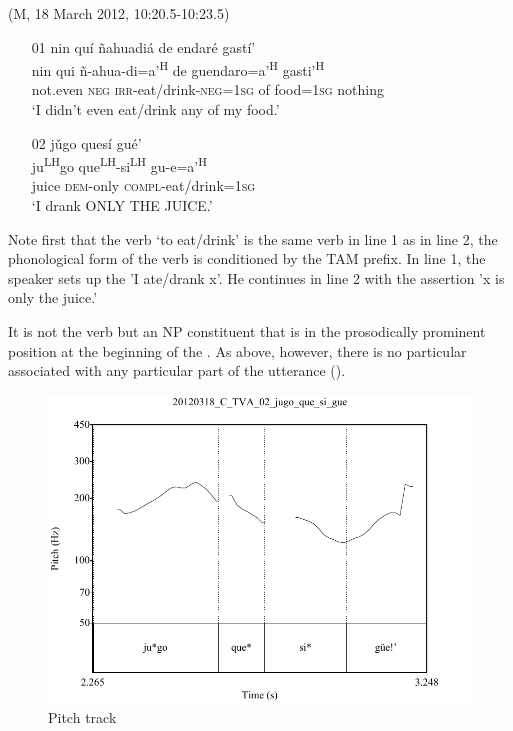 \ea\label{jugoquesigue}(M, 18 March 2012, 10:20.5-10:23.5)
\begin{itemize}
\item [01]
\glll nin qu\'{i} \~{n}ahuadi\'{a} de endar\'{e} gast\'{i}' \\
nin qui \~{n}-ahua-di=a'\textsuperscript{H} de guendaro=a'\textsuperscript{H} gasti'\textsuperscript{H}  \\
not.even \textsc{neg} \textsc{irr}-eat/drink-\textsc{neg}=\textsc{1sg} of food=\textsc{1sg} nothing \\
\glt `I didn't even eat/drink any of my food.'


\item [02]
\glll j\v{u}go ques\'{i} gu\'{e}' \\
ju\textsuperscript{LH}go que\textsuperscript{LH}-si\textsuperscript{LH} gu-e=a'\textsuperscript{H} \\
juice \textsc{dem}-only \textsc{compl}-eat/drink=\textsc{1sg} \\
\glt `I drank ONLY THE JUICE.'  

\end{itemize}
\z
Note first that the verb `to eat/drink' is the same verb in line 1 as in line 2, the phonological form of the verb is conditioned by the TAM prefix. In line 1, the speaker sets up the  'I ate/drank x'. He continues in line 2 with the assertion 'x is only the juice.'  

It is not the verb but an NP constituent that is in the prosodically prominent position at the beginning of the . As above, however, there is no particular  associated with any particular part of the utterance ().


\begin{figure} 
\caption{Pitch track}
\label{fig:5:jugoquesigue}

\includegraphics[height=.4\textheight]{jugoquesigue}
\end{figure}


